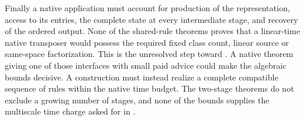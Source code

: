 Finally a native application must account for production of the representation,
access to its entries, the complete state at every intermediate stage, and
recovery of the ordered output. None of the shared-rule theorems proves that a
linear-time native transposer would possess the required fixed class count,
linear source or same-space factorization. This is the unresolved step toward
\cite[Problem~9.4]{SeventeenthPaper2026}. A native theorem giving one of those
interfaces with small paid advice could make the algebraic bounds decisive.
A construction must instead realize a complete compatible sequence of rules
within the native time budget. The two-stage theorems do not exclude a growing
number of stages, and none of the bounds supplies the multiscale time charge
asked for in \cite[Problem~9.5]{SeventeenthPaper2026}.
